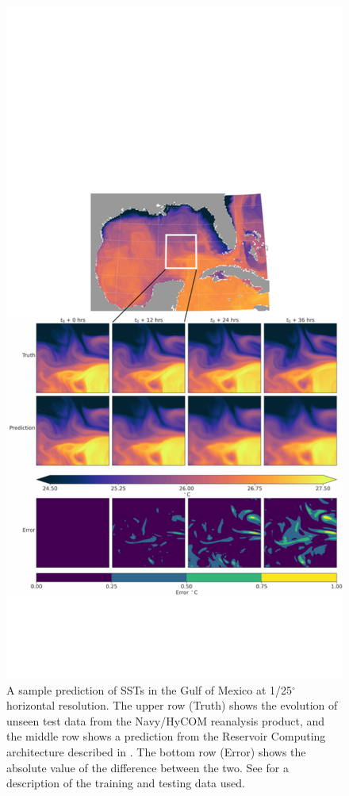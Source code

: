 \begin{figure}
    \centering
    \includegraphics[width=.8\textwidth]{../figures/rc_gom_sst.pdf}
    \caption{A sample prediction of SSTs in the Gulf of Mexico at 1/25$^\circ$
        horizontal resolution.
        The upper row (Truth) shows the evolution of unseen test data from the
        Navy/HyCOM reanalysis product, and the middle row shows a prediction
        from the Reservoir Computing architecture described in .
        The bottom row (Error) shows the absolute value of the difference between the two.
        See  for a description of the training and testing data
        used.
    }
    \label{fig:gom_sst}
\end{figure}


